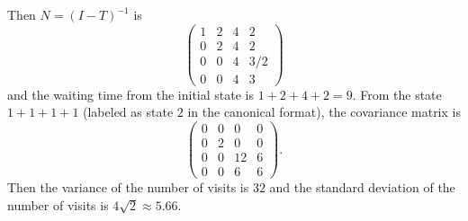 \documentclass[12pt]{article}
\begin{document}
\begin{example}
    Then \( N = (I-T)^{-1} \) is
    \[
        \begin{pmatrix}
            1 & 2 & 4 & 2\\
            0 & 2 & 4 & 2\\
            0 & 0 & 4 & 3/2\\
            0 & 0 & 4 & 3
        \end{pmatrix}
    \] and the waiting time from the initial state is \( 1 + 2 + 4 + 2 =
    9 \).  From the state \( 1+1+1+1 \) (labeled as state \( 2 \) in the
    canonical format), the covariance matrix is
    \[
        \begin{pmatrix}
            0 & 0 & 0 & 0\\
            0 & 2 & 0 & 0\\
            0 & 0 & 12 & 6\\
            0 & 0 & 6 & 6
        \end{pmatrix}
        .
    \] Then the variance of the number of visits is \( 32 \) and the
    standard deviation of the number of visits is \( 4 \sqrt{2} \approx
    5.66 \).

\end{example}
\end{document}
